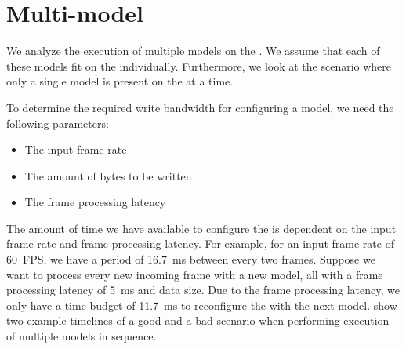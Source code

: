 \section{Multi-model}
We analyze the execution of multiple models on the \graicore{}.
We assume that each of these models fit on the \graicore{} individually.
Furthermore, we look at the scenario where only a single model is present on the \graicore{} at a time.

To determine the required write bandwidth for configuring a model, we need the following parameters:
\begin{itemize}
    \item The input frame rate
    \item The amount of bytes to be written
    \item The frame processing latency
\end{itemize}

The amount of time we have available to configure the \graicore{} is dependent on the input frame rate and frame processing latency.
For example, for an input frame rate of \SI{60}{FPS}, we have a period of \SI{16.7}{ms} between every two frames.
Suppose we want to process every new incoming frame with a new model, all with a frame processing latency of \SI{5}{ms} and data size. 
Due to the frame processing latency, we only have a time budget of \SI{11.7}{ms} to reconfigure the \graicore{} with the next model.
 show two example timelines of a good and a bad scenario when performing execution of multiple models in sequence.

%     

